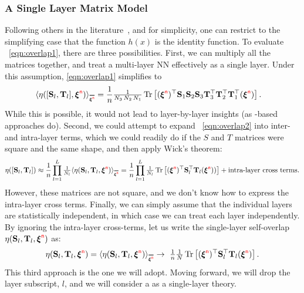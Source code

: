 \subsubsection{A Single Layer Matrix Model}
Following others in the literature~\cite{SMG2013_TR}, and for simplicity, one can restrict to the simplifying case that the function $h(x)$ is the identity function.
To evaluate \EQN~\ref{eqn:overlap1}, there are three possibilities.
First, we can multiply all the matrices together, and treat a multi-layer NN effectively as a single layer.
Under this assumption, \EQN \ref{eqn:overlap1} simplifies to
%
\begin{align}
\label{eqn:overlap2}
  \ETAMLPAVG &= \frac{1}{\ND}\tfrac{1}{N_3 \, N_2 \, N_1} 
  \Trace{ (\NDXI)^\top 
    \SMAT_1 \SMAT_2 \SMAT_3 
    \TMAT_3^{\top} \TMAT_2^{\top} \TMAT_1^{\top} 
    (\NDXI) }.
\end{align}
While this is possible, it would not lead to layer-by-layer insights (as \HTSR-based approaches do).
%
Second, we could attempt to expand \EQN~\ref{eqn:overlap2} into inter- and intra-layer terms, 
which we could readily do if the $S$ and $T$ matrices were square and the same shape, and then apply Wick's theorem:
\begin{align}
\ETAMLP\approx\frac{1}{\ND}\prod_{l=1}^{L}\tfrac{1}{N_l}\ETAMATAVG=
\frac{1}{\ND}\prod_{l=1}^{L}\tfrac{1}{N_l}\Trace{ (\NDXI)^{\top} \SMAT^{\top}_{l} \TMAT_{l} (\NDXI)) } +\text{intra-layer cross terms}.
\end{align}
However, these matrices are not square, and we don't know how to express the intra-layer cross terms.
%
Finally, we can simply assume that the individual layers are statistically independent, in which case we can treat each layer independently.
By ignoring the intra-layer cross-terms, let us write the single-layer self-overlap $\eta({\mathbf{S}}_l,{\mathbf{T}}_l,\boldsymbol{\xi}^{{\color{red}\sf{n}}})$ as:
\begin{align}
  \label{eqn:eta}
  \ETAMAT =
        \ETAMATAVG\rightarrow \
        \tfrac{1}{\ND}\tfrac{1}{N} \Trace{ (\NDXI)^{\top} \SMAT^{\top}_{l} \TMAT_{l} (\NDXI) }  .
\end{align}
This third approach is the one we will adopt.
Moving forward, we will drop the layer subscript, $l$, and we will consider a \SETOL as a single-layer theory.


